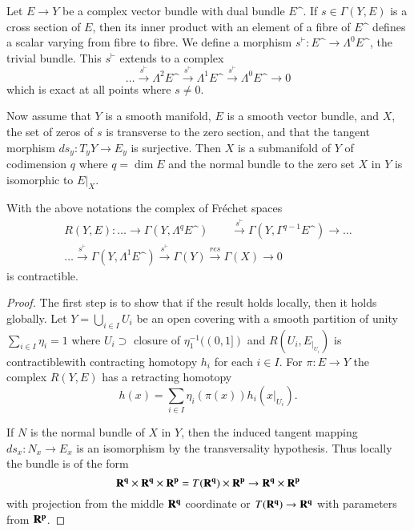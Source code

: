 \begin{remark}\label{chap6-rem4.2}
Let $E\to Y$ be a complex vector bundle with dual bundle $E\sphat$. If
$s\in \Gamma(Y,E)$ is a cross section of $E$, then its inner product
with an element of a fibre of $E\sphat$ defines a scalar varying from
fibre to fibre. We define a morphism $s^{\vdash}:E\sphat\to
\Lambda^{0}E\sphat$, the trivial bundle. This $s^{\vdash}$ extends to
a complex
$$
\ldots\xrightarrow{s^{\vdash}}\Lambda^{2}E\sphat\xrightarrow{s^{\vdash}}\Lambda^{1}E\sphat
\xrightarrow{s^{\vdash}}\Lambda^{0}E\sphat\to 0
$$
which is exact at all points where $s\neq 0$.
\end{remark}

Now assume that $Y$ is a smooth manifold, $E$ is a smooth vector
bundle, and $X$, the set of zeros of $s$ is transverse to the zero
section, and that the tangent morphism $ds_{y}:T_{y}Y\to E_{y}$ is
surjective. Then $X$ is a submanifold of $Y$ of codimension $q$ where
$q=\dim E$ and the normal bundle to the zero set $X$ in $Y$ is
isomorphic to $E|_{X}$.

\begin{proposition}\label{chap6-prop4.3}
With the above notations the complex of Fr\'echet spa\-ces
\begin{gather*}
R(Y,E):\ldots\to \Gamma(Y,\Lambda^{q}E\sphat)\qquad
\xrightarrow{s^{\vdash}}\Gamma(Y,\Gamma^{q-1}E\sphat)\to\ldots\\
\ldots\xrightarrow{s^{\vdash}}\Gamma(Y,\Lambda^{1}E\sphat)\xrightarrow{s^{\vdash}}
\Gamma(Y)\xrightarrow{res}\Gamma(X)\to 0
\end{gather*}
is contractible.
\end{proposition}

\begin{proof}
The first step is to show that if the result holds locally, then it
holds globally. Let $\displaystyle{Y=\bigcup_{i\in I}U_{i}}$ be an open covering with a
smooth partition of unity $\displaystyle{\sum_{i\in I}\eta_{i}=1}$ where
$U_{i}\supset$ closure of $\eta^{-1}_{1}((0,1])$ and
  $R(U_{i},E_{|_{U_{i}}})$ is contractible\pageoriginale with
  contracting homotopy $h_{i}$ for each $i\in I$. For $\pi:E\to Y$ the
  complex $R(Y,E)$ has a retracting homotopy
$$
h(x)=\sum_{i\in I}\eta_{i}(\pi(x))h_{i}(x|_{U_{i}}).
$$

If $N$ is the normal bundle of $X$ in $Y$, then the induced tangent
mapping $ds_{x}:N_{x}\to E_{x}$ is an isomorphism by the
transversality hypothesis. Thus locally the bundle is of the form 
$$
\mathbf{R}^{\mathbf{q}}\times \mathbf{R}^{\mathbf{q}}\times \mathbf{R}^{\mathbf{p}}=T(\mathbf{R}^{\mathbf{q}})\times
\mathbf{R}^{\mathbf{p}}\to \mathbf{R}^{\mathbf{q}}\times \mathbf{R}^{\mathbf{p}}
$$
with projection from the middle $\mathbf{R}^{\mathbf{q}}$ coordinate or
$T(\mathbf{R}^{\mathbf{q}})\to \mathbf{R}^{\mathbf{q}}$ with parameters from $\mathbf{R}^{\mathbf{p}}$.
\end{proof}

